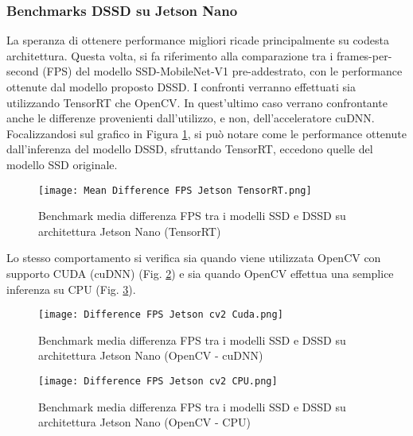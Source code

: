 \subsubsection{Benchmarks DSSD su Jetson Nano}
La speranza di ottenere performance migliori ricade principalmente su 
codesta architettura. Questa volta, si fa riferimento alla comparazione tra i 
frames-per-second (FPS) del modello SSD-MobileNet-V1 pre-addestrato, con 
le performance ottenute dal modello proposto DSSD. I confronti verranno 
effettuati sia utilizzando TensorRT che OpenCV. In quest'ultimo caso 
verrano confrontante anche le differenze provenienti dall'utilizzo, e non, 
dell'acceleratore cuDNN. Focalizzandosi sul grafico in Figura \ref{bench-jet-tensorrt}, si può 
notare come le performance ottenute dall'inferenza del modello DSSD, 
sfruttando TensorRT, eccedono quelle del modello SSD originale.
\begin{figure}
    \centering
    \texttt{[image: Mean Difference FPS Jetson TensorRT.png]}
    \centering
    \caption{Benchmark media differenza FPS tra i modelli SSD e DSSD su architettura Jetson Nano (TensorRT)}
    \label{bench-jet-tensorrt}
\end{figure}
Lo stesso 
comportamento si verifica sia quando viene utilizzata OpenCV con supporto 
CUDA (cuDNN) (Fig. \ref{bench-jet-cv2-cudnn}) e sia quando OpenCV effettua una semplice 
inferenza su CPU (Fig. \ref{bench-jet-cv2-CPU}).
\begin{figure}
    \centering
    \texttt{[image: Difference FPS Jetson cv2 Cuda.png]}
    \centering
    \caption{Benchmark media differenza FPS tra i modelli SSD e DSSD su architettura Jetson Nano (OpenCV - cuDNN)}
    \label{bench-jet-cv2-cudnn}
\end{figure}
\begin{figure}
    \centering
    \texttt{[image: Difference FPS Jetson cv2 CPU.png]}
    \centering
    \caption{Benchmark media differenza FPS tra i modelli SSD e DSSD su architettura Jetson Nano (OpenCV - CPU)}
    \label{bench-jet-cv2-CPU}
\end{figure}

